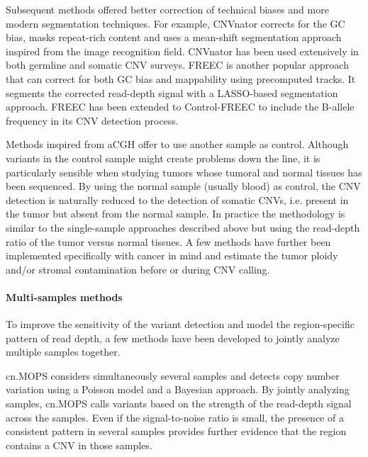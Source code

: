 Subsequent methods offered better correction of technical biases and more modern segmentation techniques.
For example, {\sf CNVnator}\cite{Abyzov2011} corrects for the GC bias, masks repeat-rich content and uses a mean-shift segmentation approach inspired from the image recognition field.
{\sf CNVnator} has been used extensively in both germline and somatic CNV surveys\cite{Sudmant2015a,Chiang2017}.
{\sf FREEC}\cite{Boeva2011} is another popular approach that can correct for both GC bias and mappability using precomputed tracks.
It segments the corrected read-depth signal with a LASSO-based segmentation approach.
{\sf FREEC} has been extended to {\sf Control-FREEC} to include the B-allele frequency in its CNV detection process.

Methods inspired from aCGH offer to use another sample as control.
Although variants in the control sample might create problems down the line, it is particularly sensible when studying tumors whose tumoral and normal tissues has been sequenced.
By using the normal sample (usually blood) as control, the CNV detection is naturally reduced to the detection of somatic CNVs, i.e. present in the tumor but absent from the normal sample.
In practice the methodology is similar to the single-sample approaches described above but using the read-depth ratio of the tumor versus normal tissues.
A few methods have further been implemented specifically with cancer in mind and estimate the tumor ploidy and/or stromal contamination before or during CNV calling\cite{Favero2015,Ha2014}.

\paragraph{Multi-samples methods}
To improve the sensitivity of the variant detection and model the region-specific pattern of read depth, a few methods have been developed to jointly analyze multiple samples together.

{\sf cn.MOPS} considers simultaneously several samples and detects copy number variation using a Poisson model and a Bayesian approach\cite{Klambauer2012}.
By jointly analyzing samples, {\sf cn.MOPS} calls variants based on the strength of the read-depth signal across the samples.
Even if the signal-to-noise ratio is small, the presence of a consistent pattern in several samples provides further evidence that the region contains a CNV in those samples.

